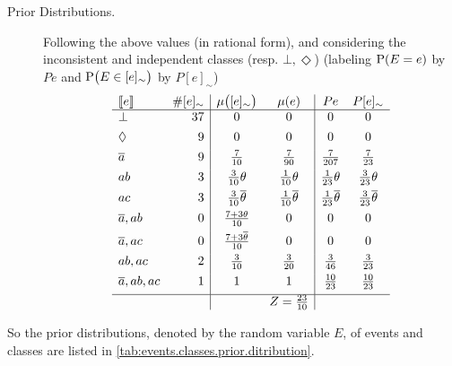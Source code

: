 \documentclass{article}
\newcommand{\at}[1]{\ensuremath{\!\del{#1}}}
\newcommand{\co}[1]{\ensuremath{\overline{#1}}}
\newcommand{\stablecore}[1]{\ensuremath{\left\llbracket #1 \right\rrbracket}}
\newcommand{\prfunc}{\ensuremath{\mathrm{P}}}
\newcommand{\pr}[1]{\ensuremath{\prfunc\at{#1}}}
\newcommand{\pw}[1]{\ensuremath{\mu\at{#1}}}
\newcommand{\class}[1]{\ensuremath{[{#1}]_{\sim}}}
\newcommand{\inconsistent}{\bot}
\newcommand{\indepclass}{\ensuremath{\Diamond}}
\begin{document}
\begin{description}
		\item[Prior Distributions.] Following the above values (in
		  rational form), and considering the inconsistent and
		  independent classes (resp. $\inconsistent, \indepclass$)
		  (labeling $\pr{E = e}$ by $Pe$ and $\pr{E \in \class{e}}$ by
		  $P\class{e}$)
		  \begin{equation*}
			  \begin{array}{lr|cc|cc}
				  \stablecore{e}
				   & \# \class{e}
				   & \pw{\class{e}}
				   & \pw{e}
				   & Pe
				   & P\class{e}
				  \\
				  \hline
				  \inconsistent
				   & 37
				   & 0
				   & 0
				   & 0
				   & 0
				  \\[4pt]
				  \indepclass
				   & 9
				   & 0
				   & 0
				   & 0
				   & 0
				  \\[4pt]
				  \co{a}
				   & 9
				   & \frac{7}{10}
				   & \frac{7}{90}
				   & \frac{7}{207}
				   & \frac{7}{23}
				  \\[4pt]
				  ab
				   & 3
				   & \frac{3}{10}\theta
				   & \frac{1}{10}\theta
				   & \frac{1}{23}\theta
				   & \frac{3}{23}\theta
				  \\[4pt]
				  ac
				   & 3
				   & \frac{3}{10}\co{\theta}
				   & \frac{1}{10}\co{\theta}
				   & \frac{1}{23}\co{\theta}
				   & \frac{3}{23}\co{\theta}
				  \\[4pt]
				  \co{a}, ab
				   & 0
				   & \frac{7 + 3\theta}{10}
				   & 0
				   & 0
				   & 0
				  \\[4pt]
				  \co{a}, ac
				   & 0
				   & \frac{7 + 3\co{\theta}}{10}
				   & 0
				   & 0
				   & 0
				  \\[4pt]
				  ab, ac
				   & 2
				   & \frac{3}{10}
				   & \frac{3}{20}
				   & \frac{3}{46}
				   & \frac{3}{23}
				  \\[4pt]
				  \co{a}, ab, ac
				   & 1
				   & 1
				   & 1
				   & \frac{10}{23}
				   & \frac{10}{23}
				  \\[4pt]
				  \hline
				   &
				   &
				   & Z = \frac{23}{10}
				   &
			  \end{array}
		  \end{equation*}
\end{description}

So the prior distributions, denoted by the random variable $E$, of
events and classes are listed in
\cref{tab:events.classes.prior.ditribution}.
\end{document}
